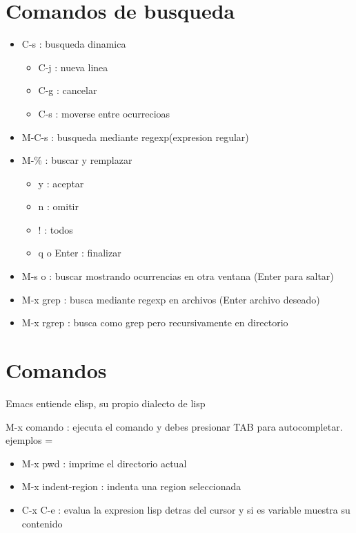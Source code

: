\documentclass[a4paper, twocolumn]{article}
\begin{document}
\begin{landscape}
\begin{multicols}{2}
\section*{Comandos de busqueda}
\begin{multicols}{2}
\begin{itemize}
	\item C-s : busqueda dinamica
	\begin{itemize}
		\item C-j : nueva linea
		\item C-g : cancelar
		\item C-s : moverse entre ocurrecioas
	\end{itemize}
	\item M-C-s : busqueda mediante regexp(expresion regular)
	\item M-\% : buscar y remplazar
	\begin{itemize}
		\item y : aceptar
		\item n : omitir
		\item ! : todos		
		\item q o Enter : finalizar
	\end{itemize}
	\item M-s o : buscar mostrando ocurrencias en otra ventana (Enter para saltar)
	\item M-x grep : busca mediante regexp en archivos (Enter archivo deseado)
	\item M-x rgrep : busca como grep pero recursivamente en directorio
\end{itemize}
\end{multicols}

\section*{Comandos}
\begin{flushleft}
Emacs entiende elisp, su propio dialecto de lisp
	\begin{flushleft}
		M-x comando : ejecuta el comando y debes presionar TAB para autocompletar.
		ejemplos =
		\begin{itemize}
		    \item M-x pwd : imprime el directorio actual
			\item M-x indent-region : indenta una region seleccionada
			\item C-x C-e : evalua la expresion lisp detras del cursor y si es variable muestra su contenido
		\end{itemize}
			

\end{flushleft}
\end{flushleft}
\end{multicols}
\end{landscape}
\end{document}
